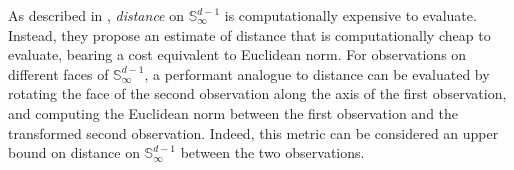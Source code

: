 As described in \cite{trubey:pg}, \emph{distance} on $\mathbb{S}_{\infty}^{d-1}$ 
    is computationally expensive to evaluate.  Instead, they propose an estimate
    of distance that is computationally cheap to evaluate, bearing a cost
    equivalent to Euclidean norm.  
    For observations on different faces of 
    $\mathbb{S}_{\infty}^{d-1}$, a performant analogue to distance can be
    evaluated by rotating the face of the second observation along the axis of
    the first observation, and computing the Euclidean norm between the first
    observation and the transformed second observation.  
    Indeed, this metric can
    be considered an upper bound on distance on $\mathbb{S}_{\infty}^{d-1}$
    between the two observations.


